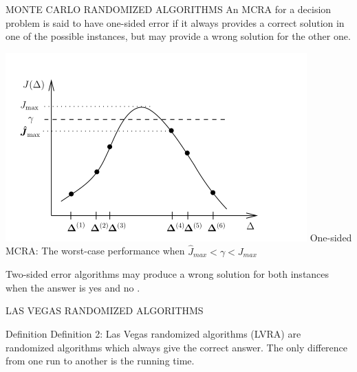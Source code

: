 \documentclass[xcolor={dvipsnames}]{beamer}
\begin{document}
	\begin{frame}{MONTE CARLO RANDOMIZED ALGORITHMS}
        An MCRA for a decision problem is said to have one-sided 
        error if it always provides a correct solution in one
        of the possible instances, but may provide a wrong solution
        for the other one.
        \begin{center}
			\includegraphics[width=0.49\linewidth]{1.png}
			One-sided MCRA: The worst-case performance when $\hat{J}_{max}<\gamma < J_{max}$
		\end{center}
        Two-sided error algorithms may produce
        a wrong solution for both instances when the answer is yes
        and no \cite{bib17}.
    \end{frame}

	\begin{frame}{LAS VEGAS RANDOMIZED ALGORITHMS}
        \begin{block}{Definition}
            Definition 2: Las Vegas randomized algorithms (LVRA)
            are randomized algorithms which always give the correct
            answer. The only difference from one run to another is the
            running time.
        \end{block}
        
    \end{frame}

\end{document}

